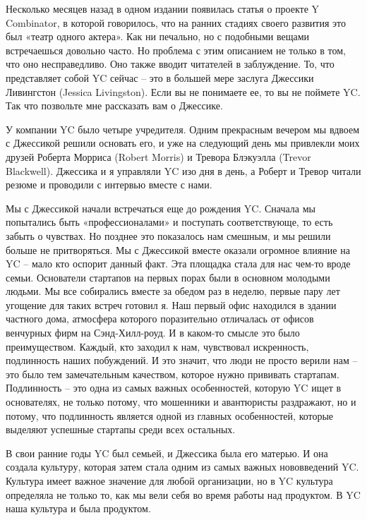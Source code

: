 \documentclass[ebook,12pt,oneside,openany]{memoir}
\begin{document}
\maketitle

Несколько месяцев назад в одном издании появилась статья о проекте Y
Combinator, в которой говорилось, что на ранних стадиях своего
развития это был «театр одного актера». Как ни печально, но с
подобными вещами встречаешься довольно часто. Но проблема с этим
описанием не только в том, что оно несправедливо. Оно также вводит
читателей в заблуждение. То, что представляет собой YC сейчас – это в
большей мере заслуга Джессики Ливингстон (Jessica Livingston). Если вы
не понимаете ее, то вы не поймете YC. Так что позвольте мне рассказать
вам о Джессике.

У компании YC было четыре учредителя. Одним прекрасным вечером мы
вдвоем с Джессикой решили основать его, и уже на следующий день мы
привлекли моих друзей Роберта Морриса (Robert Morris) и Тревора
Блэкуэлла (Trevor Blackwell). Джессика и я управляли YC изо дня в
день, а Роберт и Тревор читали резюме и проводили с интервью вместе с
нами.

Мы с Джессикой начали встречаться еще до рождения YC. Сначала мы
попытались быть «профессионалами» и поступать соответствующе, то есть
забыть о чувствах. Но позднее это показалось нам смешным, и мы решили
больше не притворяться. Мы с Джессикой вместе оказали огромное влияние
на YC – мало кто оспорит данный факт. Эта площадка стала для нас
чем-то вроде семьи. Основатели стартапов на первых порах были в
основном молодыми людьми. Мы все собирались вместе за обедом раз в
неделю, первые пару лет угощение для таких встреч готовил я. Наш
первый офис находился в здании частного дома, атмосфера которого
поразительно отличалась от офисов венчурных фирм на Сэнд-Хилл-роуд. И
в каком-то смысле это было преимуществом. Каждый, кто заходил к нам,
чувствовал искренность, подлинность наших побуждений. И это значит,
что люди не просто верили нам – это было тем замечательным качеством,
которое нужно прививать стартапам. Подлинность – это одна из самых
важных особенностей, которую YC ищет в основателях, не только потому,
что мошенники и авантюристы раздражают, но и потому, что подлинность
является одной из главных особенностей, которые выделяют успешные
стартапы среди всех остальных.

В свои ранние годы YC был семьей, и Джессика была его матерью. И она
создала культуру, которая затем стала одним из самых важных
нововведений YC. Культура имеет важное значение для любой организации,
но в YC культура определяла не только то, как мы вели себя во время
работы над продуктом. В YC наша культура и была продуктом.
\end{document}
